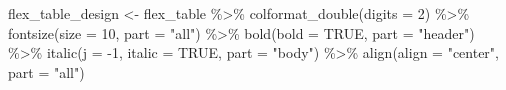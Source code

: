 \documentclass[
]{krantz}
\makeatletter
\newenvironment{Shaded}{\begin{snugshade}}{\end{snugshade}}
\newcommand{\AttributeTok}[1]{\textcolor[rgb]{0.61,0.61,0.61}{#1}}
\newcommand{\ConstantTok}[1]{\textcolor[rgb]{0,0,0}{#1}}
\newcommand{\DecValTok}[1]{\textcolor[rgb]{0.06,0.06,0.06}{#1}}
\newcommand{\FunctionTok}[1]{\textcolor[rgb]{0,0,0}{#1}}
\newcommand{\NormalTok}[1]{#1}
\newcommand{\OtherTok}[1]{\textcolor[rgb]{0.37,0.37,0.37}{#1}}
\newcommand{\SpecialCharTok}[1]{\textcolor[rgb]{0,0,0}{#1}}
\newcommand{\StringTok}[1]{\textcolor[rgb]{0.5,0.5,0.5}{#1}}
\newenvironment{kframe}{%
\medskip{}
\setlength{\fboxsep}{.8em}
 \def\at@end@of@kframe{}%
 \ifinner\ifhmode%
  \def\at@end@of@kframe{\end{minipage}}%
  \begin{minipage}{\columnwidth}%
 \fi\fi%
 \def\FrameCommand##1{\hskip\@totalleftmargin \hskip-\fboxsep
 \colorbox{shadecolor}{##1}\hskip-\fboxsep
     \hskip-\linewidth \hskip-\@totalleftmargin \hskip\columnwidth}%
 \MakeFramed {\advance\hsize-\width
   \@totalleftmargin\z@ \linewidth\hsize
   \@setminipage}}%
 {\par\unskip\endMakeFramed%
 \at@end@of@kframe}
\renewenvironment{Shaded}{\begin{kframe}}{\end{kframe}}
\makeatother
\begin{document}
\begin{Shaded}
\begin{Highlighting}[]
\NormalTok{flex\_table\_design }\OtherTok{\textless{}{-}}\NormalTok{ flex\_table }\SpecialCharTok{\%\textgreater{}\%}
  \FunctionTok{colformat\_double}\NormalTok{(}\AttributeTok{digits =} \DecValTok{2}\NormalTok{) }\SpecialCharTok{\%\textgreater{}\%}
  \FunctionTok{fontsize}\NormalTok{(}\AttributeTok{size =} \DecValTok{10}\NormalTok{, }\AttributeTok{part =} \StringTok{"all"}\NormalTok{) }\SpecialCharTok{\%\textgreater{}\%} 
  \FunctionTok{bold}\NormalTok{(}\AttributeTok{bold =} \ConstantTok{TRUE}\NormalTok{, }\AttributeTok{part =} \StringTok{"header"}\NormalTok{) }\SpecialCharTok{\%\textgreater{}\%}
  \FunctionTok{italic}\NormalTok{(}\AttributeTok{j =} \SpecialCharTok{{-}}\DecValTok{1}\NormalTok{, }\AttributeTok{italic =} \ConstantTok{TRUE}\NormalTok{, }\AttributeTok{part =} \StringTok{"body"}\NormalTok{) }\SpecialCharTok{\%\textgreater{}\%}
  \FunctionTok{align}\NormalTok{(}\AttributeTok{align =} \StringTok{"center"}\NormalTok{, }\AttributeTok{part =} \StringTok{"all"}\NormalTok{)}
\end{Highlighting}
\end{Shaded}

\providecommand{\docline}[3]{\noalign{\global\setlength{\arrayrulewidth}{#1}}\arrayrulecolor[HTML]{#2}\cline{#3}}

\setlength{\tabcolsep}{0pt}

\renewcommand*{\arraystretch}{1.5}
\end{document}
